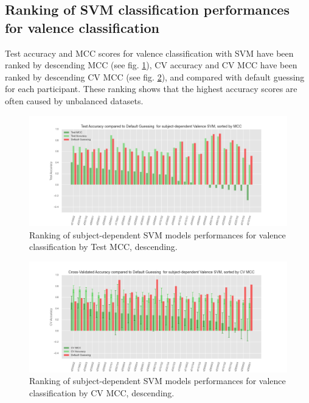 \subsection{Ranking of SVM classification performances for valence classification}
\label{sec:appendix_A4.3}
Test accuracy and \ac{MCC} scores for valence classification with \ac{SVM} have been ranked by descending \ac{MCC} (see fig. \ref{fig:test_acc_mcc_valence_svm}), CV accuracy and \ac{CV MCC} have been ranked by descending \ac{CV MCC} (see fig. \ref{fig:test_cv_acc_mcc_valence_svm}), and compared with default guessing for each participant. These ranking shows that the highest accuracy scores are often caused by unbalanced datasets. 

\begin{figure}[!htb]
\includegraphics[width=16cm]{img/appendix/final_experiment/test_acc_mcc_valence_svm.png}
\centering
\caption{Ranking of subject-dependent SVM models performances for valence classification by Test MCC, descending.}\label{fig:test_acc_mcc_valence_svm}
\end{figure}

\begin{figure}[!htb]
\includegraphics[width=16cm]{img/appendix/final_experiment/test_cv_acc_mcc_valence_svm.png}
\centering
\caption{Ranking of subject-dependent SVM models performances for valence classification by CV MCC, descending.}\label{fig:test_cv_acc_mcc_valence_svm}
\end{figure}
\FloatBarrier

